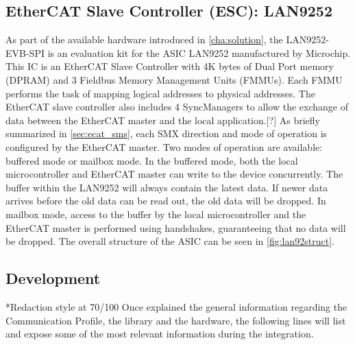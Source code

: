 \subsection{EtherCAT Slave Controller (ESC): LAN9252} 
As part of the available hardware introduced in \ref{cha:solution}, the LAN9252-EVB-SPI is an evaluation kit for the ASIC LAN9252 manufactured by Microchip. 
This IC is an EtherCAT Slave Controller with 4K bytes of Dual Port memory (DPRAM) and 3 Fieldbus Memory Management Units (FMMUs). 
Each FMMU performs the task of mapping logical addresses to physical addresses.
The EtherCAT slave controller also includes 4 SyncManagers to allow the exchange of data between the EtherCAT master and the local application.[?]%
As briefly summarized in \ref{sec:ecat_sms}, each SMX direction and mode of operation is configured by the EtherCAT master. Two modes of operation 
are available: buffered mode or mailbox mode. 
In the buffered mode, both the local microcontroller and EtherCAT master can write to the device concurrently. The buffer within the LAN9252 
will always contain the latest data. If newer data arrives before the old data can be read out, the old data will be dropped. In mailbox
mode, access to the buffer by the local microcontroller and the EtherCAT master is performed using handshakes, guaranteeing that no data 
will be dropped. The overall structure of the ASIC can be seen in \ref{fig:lan92struct}.



\subsection{Development}
*Redaction style at 70/100
Once explained the general information regarding the Communication Profile, the library and the hardware, the following lines will list and
expose some of the most relevant information during the integration. 

